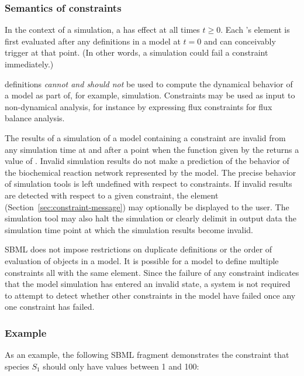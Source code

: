 \subsubsection{Semantics of constraints}
\label{sec:constraint-semantics}

In the context of a simulation, a \Constraint has effect at all
times $t \geq 0$.  Each \Constraint's  element is first
evaluated after any \InitialAssignment definitions in a model at
$t = 0$ and can conceivably trigger at that point.  (In other
words, a simulation could fail a constraint immediately.)

\Constraint definitions \emph{cannot and should not} be used to
compute the dynamical behavior of a model as part of, for example,
simulation.  Constraints may be used as input to non-dynamical
analysis, for instance by expressing flux constraints for flux
balance analysis.

The results of a simulation of a model containing a constraint are
invalid from any simulation time at and after a point when the
function given by the  returns a value of .
Invalid simulation results do not make a prediction of the
behavior of the biochemical reaction network represented by the
model.  The precise behavior of simulation tools is left undefined
with respect to constraints.  If invalid results are detected with
respect to a given constraint, the  element
(Section~\ref{sec:constraint-message}) may optionally be displayed
to the user.  The simulation tool may also halt the simulation or
clearly delimit in output data the simulation time point at which
the simulation results become invalid.

SBML does not impose restrictions on duplicate \Constraint
definitions or the order of evaluation of \Constraint objects in a
model.  It is possible for a model to define multiple constraints
all with the same  element.  Since the failure of any
constraint indicates that the model simulation has entered an
invalid state, a system is not required to attempt to detect
whether other constraints in the model have failed once any one
constraint has failed.


\subsubsection{Example}

As an example, the following SBML fragment demonstrates the
constraint that species $S_1$ should only have values between 1
and 100:

